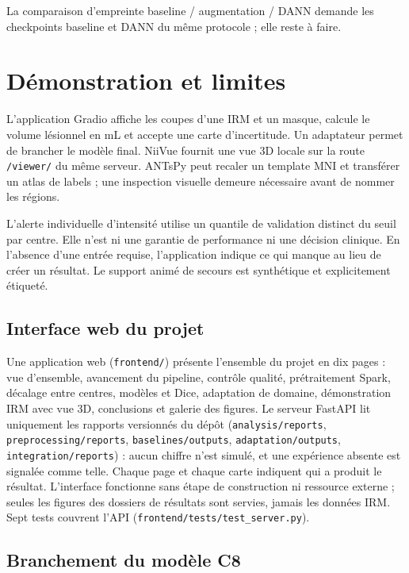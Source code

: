 La comparaison d'empreinte baseline / augmentation / DANN demande les checkpoints baseline et
DANN du même protocole ; elle reste à faire.

\section{Démonstration et limites}
\label{sec:yosra-demo}

L'application Gradio affiche les coupes d'une IRM et un masque, calcule le volume lésionnel en mL et accepte une carte d'incertitude.
Un adaptateur permet de brancher le modèle final.
NiiVue fournit une vue 3D locale sur la route \texttt{/viewer/} du même serveur.
ANTsPy peut recaler un template MNI et transférer un atlas de labels ; une inspection visuelle demeure nécessaire avant de nommer les régions.

L'alerte individuelle d'intensité utilise un quantile de validation distinct du seuil par centre.
Elle n'est ni une garantie de performance ni une décision clinique.
En l'absence d'une entrée requise, l'application indique ce qui manque au lieu de créer un résultat.
Le support animé de secours est synthétique et explicitement étiqueté.

\subsection{Interface web du projet}
\label{sec:yosra-frontend}

Une application web (\texttt{frontend/}) présente l'ensemble du projet en dix pages :
vue d'ensemble, avancement du pipeline, contrôle qualité, prétraitement Spark, décalage entre
centres, modèles et Dice, adaptation de domaine, démonstration IRM avec vue 3D, conclusions
et galerie des figures. Le serveur FastAPI lit uniquement les rapports versionnés du dépôt
(\texttt{analysis/reports}, \texttt{preprocessing/reports}, \texttt{baselines/outputs},
\texttt{adaptation/outputs}, \texttt{integration/reports}) : aucun chiffre n'est simulé, et une
expérience absente est signalée comme telle. Chaque page et chaque carte indiquent qui a
produit le résultat. L'interface fonctionne sans étape de construction ni ressource externe ;
seules les figures des dossiers de résultats sont servies, jamais les données IRM. Sept tests
couvrent l'API (\texttt{frontend/tests/test\_server.py}).

\subsection{Branchement du modèle C8}
\label{sec:yosra-c8}

